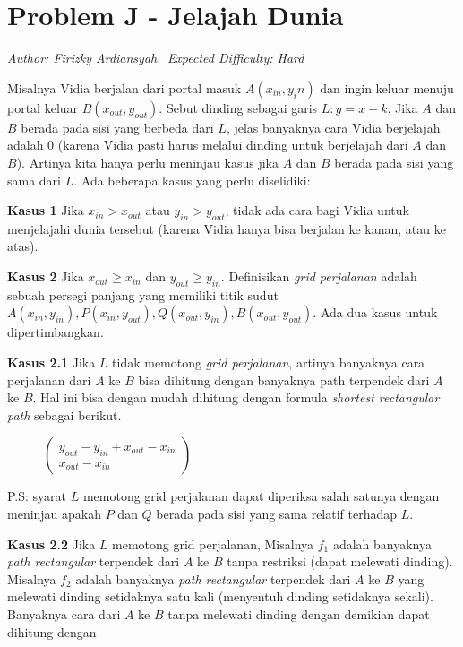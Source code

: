 \documentclass{article}
\begin{document}
\section*{Problem J - Jelajah Dunia}
\textit{Author: Firizky Ardiansyah}
\
\textit{Expected Difficulty: Hard}

Misalnya Vidia berjalan dari portal masuk $A(x_{in},y_{i}n)$ dan ingin keluar menuju portal keluar $B(x_{out},y_{out})$. Sebut dinding sebagai garis $L:y=x+k$. Jika $A$ dan $B$ berada pada sisi yang berbeda dari $L$, jelas banyaknya cara Vidia berjelajah adalah 0 (karena Vidia pasti harus melalui dinding untuk berjelajah dari $A$ dan $B$). Artinya kita hanya perlu meninjau kasus jika $A$ dan $B$ berada pada sisi yang sama dari $L$. Ada beberapa kasus yang perlu diselidiki:

\textbf{Kasus 1}
Jika $x_{in} > x_{out}$ atau $y_{in} > y_{out}$, tidak ada cara bagi Vidia untuk menjelajahi dunia tersebut (karena Vidia hanya bisa berjalan ke kanan, atau ke atas).

\textbf{Kasus 2}
Jika $x_{out} \geq x_{in}$ dan $y_{out} \geq y_{in}$. Definisikan \textit{grid perjalanan} adalah sebuah persegi panjang yang memiliki titik sudut $A(x_{in},y_{in} ),P(x_{in},y_{out} ),Q(x_{out},y_{in} ),B(x_{out},y_{out})$. Ada dua kasus untuk dipertimbangkan.

\textbf{Kasus 2.1}
Jika $L$ tidak memotong \textit{grid perjalanan}, artinya banyaknya cara perjalanan dari $A$ ke $B$ bisa dihitung dengan banyaknya path terpendek dari $A$ ke $B$. Hal ini bisa dengan mudah dihitung dengan formula \textit{shortest rectangular path} sebagai berikut.

\begin{figure}[ht]
\centering
    $\begin{pmatrix}
    y_{out}-y_{in}+x_{out}-x_{in}\\
    x_{out}-x_{in}
    \end{pmatrix}$
\end{figure}

P.S: syarat $L$ memotong grid perjalanan dapat diperiksa salah satunya dengan meninjau apakah $P$ dan $Q$ berada pada sisi yang sama relatif terhadap $L$.

\textbf{Kasus 2.2}
Jika $L$ memotong grid perjalanan, Misalnya $f_1$ adalah banyaknya \textit{path rectangular} terpendek dari $A$ ke $B$ tanpa restriksi (dapat melewati dinding). Misalnya $f_2$ adalah banyaknya \textit{path rectangular} terpendek dari $A$ ke $B$ yang melewati dinding setidaknya satu kali (menyentuh dinding setidaknya sekali). Banyaknya cara dari $A$ ke $B$ tanpa melewati dinding dengan demikian dapat dihitung dengan
\end{document}

